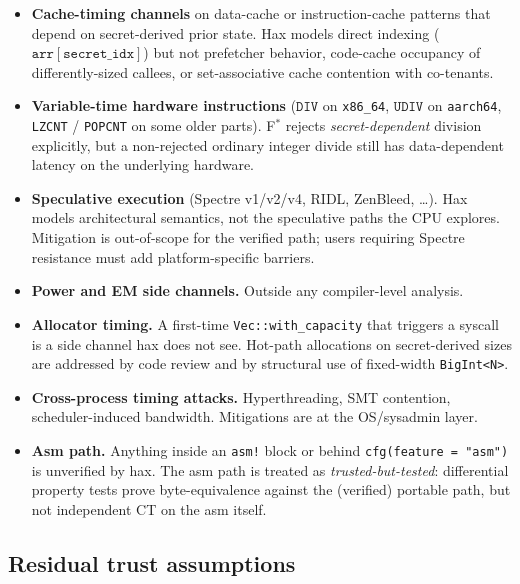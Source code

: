 \begin{itemize}[nosep]
  \item \textbf{Cache-timing channels} on data-cache or
        instruction-cache patterns that depend on secret-derived
        prior state.  Hax models direct indexing
        ($\texttt{arr}[\texttt{secret\_idx}]$) but not prefetcher
        behavior, code-cache occupancy of differently-sized
        callees, or set-associative cache contention with
        co-tenants.
  \item \textbf{Variable-time hardware instructions} ($\texttt{DIV}$
        on \texttt{x86\_64}, $\texttt{UDIV}$ on \texttt{aarch64},
        \texttt{LZCNT} / \texttt{POPCNT} on some older parts).
        F$^*$ rejects \emph{secret-dependent} division explicitly,
        but a non-rejected ordinary integer divide still has data-dependent
        latency on the underlying hardware.
  \item \textbf{Speculative execution} (Spectre v1/v2/v4, RIDL,
        ZenBleed, \dots).  Hax models architectural semantics, not
        the speculative paths the CPU explores.  Mitigation is
        out-of-scope for the verified path; users requiring
        Spectre resistance must add platform-specific barriers.
  \item \textbf{Power and EM side channels.}  Outside any
        compiler-level analysis.
  \item \textbf{Allocator timing.}  A first-time
        \texttt{Vec::with\_capacity} that triggers a syscall is a
        side channel hax does not see.  Hot-path allocations on
        secret-derived sizes are addressed by code review and
        by structural use of fixed-width \texttt{BigInt<N>}.
  \item \textbf{Cross-process timing attacks.}  Hyperthreading,
        SMT contention, scheduler-induced bandwidth.  Mitigations
        are at the OS/sysadmin layer.
  \item \textbf{Asm path.}  Anything inside an \texttt{asm!} block
        or behind \texttt{cfg(feature = "asm")} is unverified by
        hax.  The asm path is treated as
        \emph{trusted-but-tested}: differential property tests
        prove byte-equivalence against the (verified) portable
        path, but not independent CT on the asm itself.
\end{itemize}

\subsection{Residual trust assumptions}

